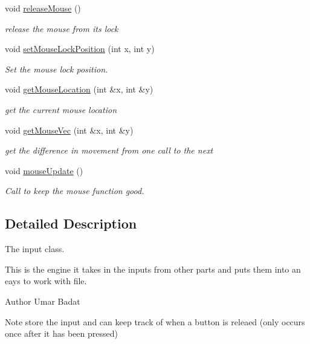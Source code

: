 \begin{DoxyCompactItemize}
void \hyperlink{class_input_a2af99e8e16adb1d99684edf8b77e53ea}{release\-Mouse} ()
\begin{DoxyCompactList}\small\item\em release the mouse from its lock \end{DoxyCompactList}\item 
void \hyperlink{class_input_aae244dc7ffdd7736b1c8660631c51793}{set\-Mouse\-Lock\-Position} (int x, int y)
\begin{DoxyCompactList}\small\item\em Set the mouse lock position. \end{DoxyCompactList}\item 
void \hyperlink{class_input_adb2a5b2e67f5516254b515675ed99a46}{get\-Mouse\-Location} (int \&x, int \&y)
\begin{DoxyCompactList}\small\item\em get the current mouse location \end{DoxyCompactList}\item 
void \hyperlink{class_input_a6739e45b765de931e931c2048bed6cb1}{get\-Mouse\-Vec} (int \&x, int \&y)
\begin{DoxyCompactList}\small\item\em get the difference in movement from one call to the next \end{DoxyCompactList}\item 
void \hyperlink{class_input_a4491443d2a0c9e8c562d798d38017651}{mouse\-Update} ()
\begin{DoxyCompactList}\small\item\em Call to keep the mouse function good. \end{DoxyCompactList}\end{DoxyCompactItemize}


\subsection{Detailed Description}
The input class. 

This is the engine it takes in the inputs from other parts and puts them into an eays to work with file.

\begin{DoxyAuthor}{Author}
Umar Badat 
\end{DoxyAuthor}
\begin{DoxyNote}{Note}
store the input and can keep track of when a button is releaed (only occurs once after it has been pressed) 
\end{DoxyNote}


